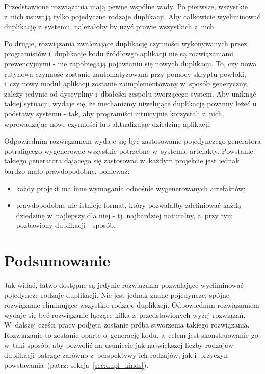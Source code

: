 Przedstawione rozwiązania mają pewne wspólne wady.
Po pierwsze, wszystkie z~nich usuwają tylko pojedyczne rodzaje duplikacji.
Aby całkowicie wyeliminować duplikację z~systemu, należałoby by użyć prawie wszystkich z~nich.

Po drugie, rozwiązania zwalczające duplikację czynności wykonywanych przez programistów i~duplikacje kodu źródłowgo aplikacji nie są rozwiązaniami prewencyjnymi - nie zapobiegają pojawianiu się nowych duplikacji.
To, czy nowa rutynowa czynność zostanie zautomatyzowana przy pomocy skryptu powłoki, i~czy nowy moduł aplikacji zostanie zaimplementowany w~sposób generyczny, zależy jedynie od dyscypliny i~dbałości zespołu tworzącego system.
Aby uniknąć takiej sytuacji, wydaje się, że mechanizmy niwelujące duplikację powinny leżeć u podstawy systemu - tak, aby programiści intuicyjnie korzystali z~nich, wprowadzając nowe czynności lub aktualizując dziedzinę aplikacji.

Odpowiednim rozwiązaniem wydaje się być zastosowanie pojedynczego generatora potrafiącego wygenerować wszystkie potrzebne w~systemie artefakty.
Powstanie takiego generatora dającego się zastosować w~każdym projekcie jest jednak bardzo mało prawdopodobne, ponieważ:

\begin{itemize}
 \item każdy projekt ma inne wymagania odnośnie wygenerowanych artefaktów;
 \item prawdopodobne nie istnieje format, który pozwalałby zdefiniować każdą dziedzinę w~najlepszy dla niej - tj. najbardziej naturalny, a~przy tym pozbawiony duplikacji - sposób.
\end{itemize}



\section{Podsumowanie}

Jak widać, łatwo dostępne są jedynie rozwiązania pozwalające wyeliminować pojedyncze rodzaje duplikacji.
Nie jest jednak znane pojedyncze, spójne rozwiązanie eliminujące wszystkie rodzaje duplikacji.
Odpowiednim rozwiązaniem wydaje się być rozwiązanie łączące kilka z~przedstawionych wyżej rozwiązań.
W~dalszej części pracy podjęta zostanie próba stworzenia takiego rozwiązania.
Rozwiązanie to zostanie oparte o~generację kodu, a~celem jest skonstruowanie go w~taki sposób, aby pozwolić na usunięcie jak największej liczby rodzajów duplikacji patrząc zarówno z~perspektywy ich rodzajów, jak i~przyczyn powstawania~(patrz: sekcja~\ref{sec:dupl_kinds}).
